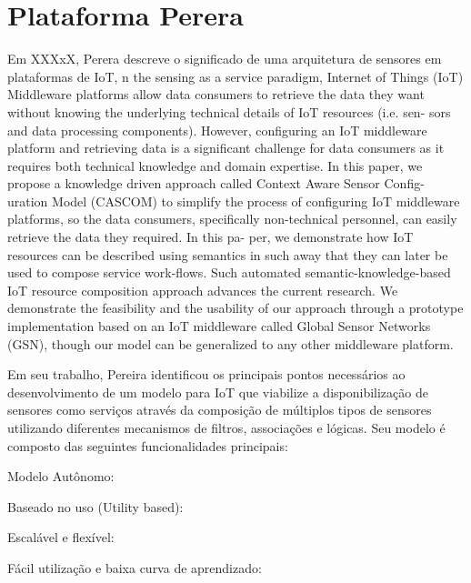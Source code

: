 \section{Plataforma Perera}

Em XXXxX, Perera descreve o significado de uma arquitetura de sensores em plataformas de IoT, 
n the sensing as a service paradigm, Internet of Things (IoT) Middleware platforms allow data consumers to retrieve the data they want without knowing the underlying technical details of IoT resources (i.e. sen- sors and data processing components). However, configuring an IoT middleware platform and retrieving data is a significant challenge for data consumers as it requires both technical knowledge and domain expertise. In this paper, we propose a knowledge driven approach called Context Aware Sensor Config- uration Model (CASCOM) to simplify the process of configuring IoT middleware platforms, so the data consumers, specifically non-technical personnel, can easily retrieve the data they required. In this pa- per, we demonstrate how IoT resources can be described using semantics in such away that they can later be used to compose service work-flows. Such automated semantic-knowledge-based IoT resource composition approach advances the current research. We demonstrate the feasibility and the usability of our approach through a prototype implementation based on an IoT middleware called Global Sensor Networks (GSN), though our model can be generalized to any other middleware platform. 

Em seu trabalho, Pereira identificou os principais pontos necessários ao desenvolvimento de um modelo para IoT que viabilize a disponibilização de sensores como serviços através da composição de múltiplos tipos de sensores utilizando diferentes mecanismos de filtros, associações e lógicas. Seu modelo é composto das seguintes funcionalidades principais:

Modelo Autônomo:

Baseado no uso (Utility based):

Escalável e flexível:

Fácil utilização e baixa curva de aprendizado:

